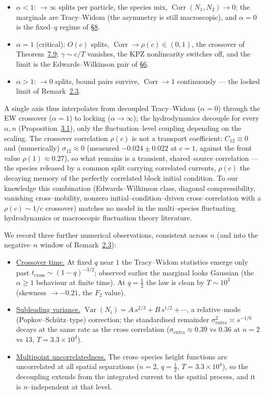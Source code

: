 \documentclass[11pt]{article}
\theoremstyle{plain}
\theoremstyle{definition}
\theoremstyle{remark}
\DeclareMathOperator{\Var}{Var}\DeclareMathOperator{\Cov}{Cov}
\DeclareMathOperator{\Corr}{Corr}\DeclareMathOperator{\cum}{cum}
\begin{document}
\begin{itemize}
\item $\alpha<1$: $\to\infty$ splits per particle, the species mix,
$\Corr(N_1,N_2)\to0$; the marginals are Tracy--Widom (the asymmetry is still
macroscopic), and $\alpha=0$ is the fixed--$q$ regime of \S\hyperref[sec_tw]{8}.
\item $\alpha=1$ (critical): $O(c)$ splits, $\Corr\to\rho(c)\in(0,1)$, the crossover of
Theorem~\hyperref[thm_closed]{7.9}; $\gamma\sim c/T$ vanishes, the KPZ nonlinearity switches off,
and the limit is the Edwards--Wilkinson pair of \S\hyperref[sec_ew]{6}.
\item $\alpha>1$: $\to0$ splits, bound pairs survive, $\Corr\to1$ continuously --- the
locked limit of Remark~\hyperref[rem_range]{2.3}.
\end{itemize}

\noindent A single axis thus interpolates from decoupled Tracy--Widom ($\alpha=0$)
through the EW crossover ($\alpha=1$) to locking ($\alpha\to\infty$); the hydrodynamics
decouple for every $\alpha,n$ (Proposition~\hyperref[prop_decouple]{3.1}), only the
fluctuation--level coupling depending on the scaling. The crossover correlation
$\rho(c)$ is not a transport coefficient: $C_{12}\equiv0$ and (numerically)
$\sigma_{12}\approx0$ (measured $-0.024\pm0.022$ at $c=1$, against the front value
$\rho(1)\approx0.27$), so what remains is a transient, shared--source correlation --- the
species released by a common split carrying correlated currents, $\rho(c)$ the decaying
memory of the perfectly correlated block initial condition. To our knowledge this
combination (Edwards--Wilkinson class, diagonal compressibility, vanishing
cross--mobility, nonzero initial--condition--driven cross--correlation with a
$\rho(c)\sim1/c$ crossover) matches no model in the multi--species fluctuating
hydrodynamics or macroscopic fluctuation theory literature.

We record three further numerical observations, consistent across $n$ (and into the
negative--$n$ window of Remark~\hyperref[rem_range]{2.3}):
\begin{itemize}
\item \underline{Crossover time.} At fixed $q$ near $1$ the Tracy--Widom statistics emerge only
past $t_{\mathrm{cross}}\sim(1-q)^{-3/2}$; observed earlier the marginal looks Gaussian
(the $\alpha\ge1$ behaviour at finite time). At $q=\tfrac12$ the law is clean by
$T\sim10^3$ (skewness $\to-0.21$, the $F_2$ value).
\item \underline{Subleading variance.} $\Var(N_i)=A\,s^{2/3}+B\,s^{1/2}+\cdots$, a
relative--mode (Popkov--Sch\"utz--type) correction; the standardised remainder
$\sigma_{\mathrm{extra}}^2\asymp s^{-1/6}$ decays at the same rate as the cross
correlation ($\sigma_{\mathrm{extra}}\approx0.39$ vs $0.36$ at $n=2$ vs $13$,
$T=3.3\times10^4$).
\item \underline{Multipoint uncorrelatedness.} The cross--species height functions are
uncorrelated at all spatial separations ($n=2$, $q=\tfrac12$, $T=3.3\times10^4$), so
the decoupling extends from the integrated current to the spatial process, and it is
$n$--independent at that level.
\end{itemize}
\end{document}
